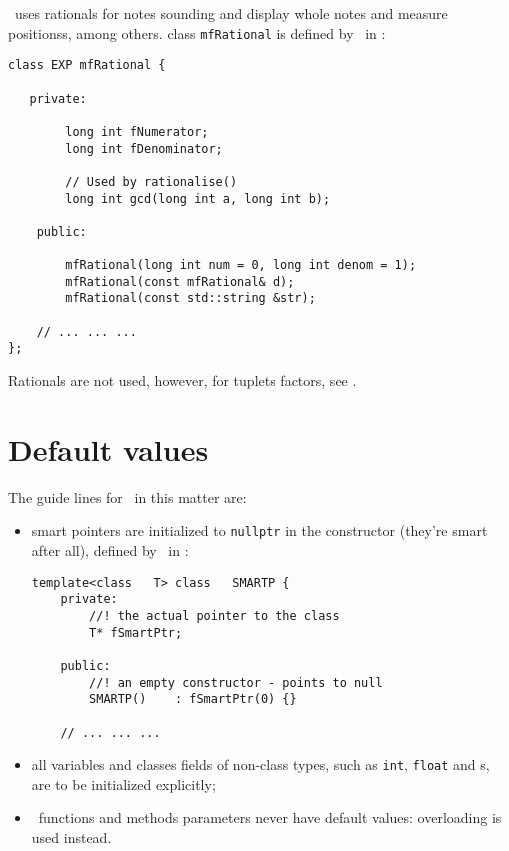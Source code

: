 \mf\ uses rationals for notes sounding and display whole notes and measure positionss, among others.
class   {\tt mfRational} is defined by \libmusicxml\ in :
\begin{lstlisting}[language=CPlusPlus]
class EXP mfRational {

   private:

        long int fNumerator;
        long int fDenominator;

        // Used by rationalise()
        long int gcd(long int a, long int b);

    public:

        mfRational(long int num = 0, long int denom = 1);
        mfRational(const mfRational& d);
        mfRational(const std::string &str);

	// ... ... ...
};
\end{lstlisting}

Rationals are not used, however, for tuplets factors, see .


\section{Default values}

The guide lines for \mf\ in this matter are:
\begin{itemize}
\item smart pointers are initialized to {\tt nullptr} in the  constructor (they're smart after all), defined by \libmusicxml\ in :
\begin{lstlisting}[language=CPlusPlus]
template<class   T> class   SMARTP {
	private:
		//! the actual pointer to the class
		T* fSmartPtr;

	public:
		//! an empty constructor - points to null
		SMARTP()	: fSmartPtr(0) {}

	// ... ... ...
\end{lstlisting}

\item all variables and classes fields of non-class   types, such as {\tt int}, {\tt float} and \enumType s, are to be initialized explicitly;

\item \mf\ functions and methods parameters never have default values: overloading is used instead.
\end{itemize}


